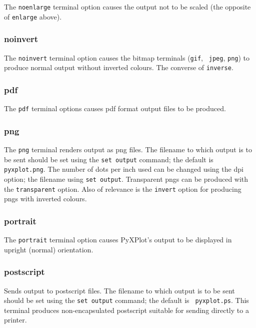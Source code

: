 The {\tt noenlarge} terminal option causes the output not to be scaled (the
opposite of {\tt enlarge} above).


\subsubsection{noinvert}

The {\tt noinvert} terminal option causes the bitmap terminals ({\tt gif}, {\tt
jpeg}, {\tt png}) to produce normal output without inverted colours. The
converse of {\tt inverse}.


\subsubsection{pdf}

The {\tt pdf} terminal options causes pdf format output files to be produced.


\subsubsection{png}

The {\tt png} terminal renders output as png files. The filename to which output
is to be sent should be set using the {\tt set output} command; the default is
{\tt pyxplot.png}. The number of dots per inch used can be changed using the dpi
option; the filename using {\tt set output}. Transparent pngs can be produced
with the {\tt transparent} option. Also of relevance is the {\tt invert} option
for producing pngs with inverted colours.


\subsubsection{portrait}

The {\tt portrait} terminal option causes PyXPlot's output to be displayed in
upright (normal) orientation.


\subsubsection{postscript}

Sends output to postscript files. The filename to which output is to be sent
should be set using the {\tt set output} command; the default is {\tt
pyxplot.ps}.  This terminal produces non-encapsulated postscript suitable for
sending directly to a printer.


